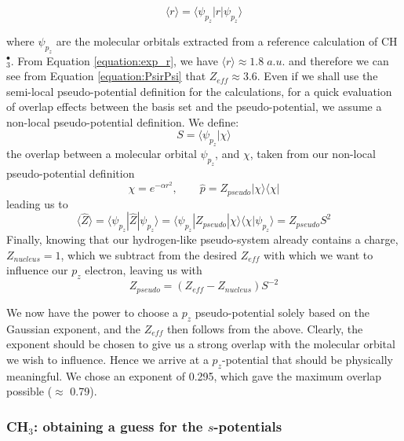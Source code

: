 \documentclass[12pt]{article}
\begin{document}
\begin{equation}
\langle r \rangle = \langle \psi_{p_{z}} | r | \psi_{p_{z}} \rangle
\label{equation:exp_r}
\end{equation}

where \(\psi_{p_{z}}\) are the molecular orbitals extracted from a reference calculation of CH\(^{\bullet}_{3}\). From Equation \ref{equation:exp_r}, we have \( \langle r \rangle \approx 1.8\;a.u.\) and therefore we can see from Equation \ref{equation:PsirPsi} that \(Z_{eff} \approx 3.6\). Even if we shall use the semi-local pseudo-potential definition for the calculations, for a quick evaluation of overlap effects between the basis set and the pseudo-potential, we assume a non-local pseudo-potential definition. We define:
\begin{equation}
S = \langle \psi_{p_{z}} | \chi \rangle
\end{equation}
the overlap between a molecular orbital \(\psi_{p_{z}}\), and \(\chi\), taken from our non-local pseudo-potential definition \cite{huzinaga_effective_1991}
\begin{equation}
\chi = e^{-\alpha r^{2}},\qquad \widehat{p} = Z_{pseudo} | \chi \rangle \langle \chi |
\end{equation}
leading us to
\begin{equation}
\langle \widehat{Z} \rangle = \langle \psi_{p_{z}} | \widehat{Z} | \psi_{p_{z}} \rangle = \langle \psi_{p_{z}} | Z_{pseudo} | \chi \rangle \langle \chi | \psi_{p_{z}} \rangle = Z_{pseudo} S^{2}
\end{equation}
Finally, knowing that our hydrogen-like pseudo-system already contains a charge, \(Z_{nucleus}=1\), which we subtract from the desired \(Z_{eff}\) with which we want to influence our \(p_{z}\) electron, leaving us with
\begin{equation}
Z_{pseudo} = (Z_{eff} - Z_{nucleus})S^{-2}
\end{equation}

We now have the power to choose a \(p_{z}\) pseudo-potential solely based on the Gaussian exponent, and the \(Z_{eff}\) then follows from the above. Clearly, the exponent should be chosen to give us a strong overlap with the molecular orbital we wish to influence. Hence we arrive at a \(p_{z}\)-potential that should be physically meaningful. We chose an exponent of 0.295, which gave the maximum overlap possible ($\approx$ 0.79).

\subsubsection*{\sffamily \large CH\(_{3}\): obtaining a guess for the \(s\)-potentials}
\end{document}

